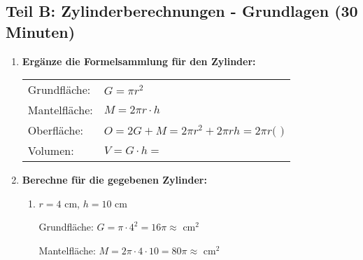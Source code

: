 \subsection*{Teil B: Zylinderberechnungen - Grundlagen (30 Minuten)}

\begin{enumerate}[label=\arabic*., resume]

    \item \textbf{Ergänze die Formelsammlung für den Zylinder:}
    \vspace{0.5cm}

    \begin{center}
    \end{center}

    \begin{tabular}{ll}
        Grundfläche: & $G = \pi r^2$ \\[1ex]
        Mantelfläche: & $M = 2\pi r \cdot h$ \\[1ex]
        Oberfläche: & $O = 2G + M = 2\pi r^2 + 2\pi rh = 2\pi r($ \underline{\hspace{2cm}} $)$ \\[1ex]
        Volumen: & $V = G \cdot h =$ \underline{\hspace{3cm}}
    \end{tabular}

    \vspace{1cm}

    \item \textbf{Berechne für die gegebenen Zylinder:}
    \vspace{0.5cm}

    \begin{enumerate}[label=\alph*)]
        \item $r = 4$ cm, $h = 10$ cm

        Grundfläche: $G = \pi \cdot 4^2 = 16\pi \approx$ \underline{\hspace{2cm}} cm$^2$

        Mantelfläche: $M = 2\pi \cdot 4 \cdot 10 = 80\pi \approx$ \underline{\hspace{2cm}} cm$^2$


\end{enumerate}
\end{enumerate}
